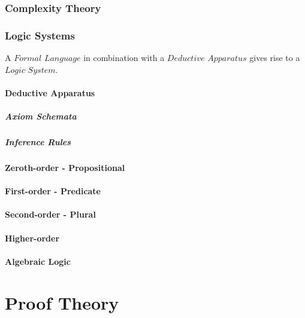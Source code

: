 \documentclass{article}
\begin{document}
\section{Complexity Theory}

\section{Logic Systems}

A $Formal$ $Language$ in combination with a $Deductive$ $Apparatus$
gives rise to a $Logic$ $System$.

\subsection{Deductive Apparatus}

\subsubsection{Axiom Schemata}

\subsubsection{Inference Rules}

\subsection{Zeroth-order - Propositional}

\subsection{First-order - Predicate}

\subsection{Second-order - Plural}

\subsection{Higher-order}

\subsection{Algebraic Logic}



\part{Proof Theory}
\end{document}
